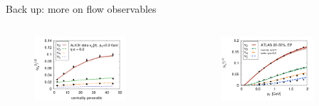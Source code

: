 \documentclass[11pt]{beamer}
\begin{document}
\begin{frame}[noframenumbering]{Back up: more on flow observables}
\begin{columns}
 \begin{column}{0.5\textwidth}
    \begin{figure}
   	\begin{center}
   	\includegraphics[width=0.8\textwidth]{pics/Gale-1.png}
	\end{center} 	
  	\end{figure}
  \end{column}
  \begin{column}{0.5\textwidth}
  	\begin{figure}
   	\begin{center}
   	\includegraphics[width=0.8\textwidth]{pics/Gale-2.png}
	\end{center} 	
  	\end{figure}
  \end{column}
\end{columns}
\end{frame}
\end{document}

